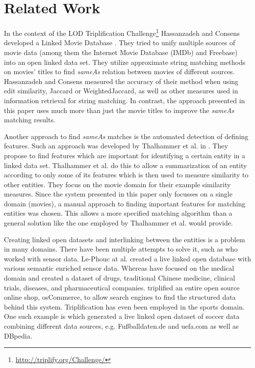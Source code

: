 \section{Related Work}
\label{sec_related_work}


In the context of the LOD Triplification Challenge\footnote{\url{http://triplify.org/Challenge/}} Hassanzadeh and Consens developed a Linked Movie Database \cite{LMDB}.
They tried to unify multiple sources of movie data (among them the Internet Movie Database (IMDb) and Freebase) into an open linked data set.
They utilize approximate string matching methods on movies' titles to find \textit{sameAs} relation between movies of different sources.
Hassanzadeh and Consens measured the accuracy of their method when using edit similarity, Jaccard or WeightedJaccard, as well as other measures used in information retrieval for string matching.
In contrast, the approach presented in this paper uses much more than just the movie titles to improve the \textit{sameAs} matching results.

Another approach to find \textit{sameAs} matches is the automated detection of defining features.
Such an approach was developed by Thalhammer et al. in \cite{MovieSummarization}.
They propose to find features which are important for identifying a certain entity in a linked data set.
Thalhammer et al. do this to allow a summarization of an entity according to only some of its features which is then used to measure similarity to other entities.
They focus on the movie domain for their example similarity measures.
Since the system presented in this paper only focusses on a single domain (movies), a manual approach to finding important features for matching entities was chosen.
This allows a more specified matching algorithm than a general solution like the one employed by Thalhammer et al. would provide.

Creating linked open datasets and interlinking between the entities is a problem in many domains.
There have been multiple attempts to solve it, such as \cite{SensorData} who worked with sensor data.
Le-Phouc at al. created a live linked open database with various semantic enriched sensor data.
Whereas \cite{openDrugData} have focused on the medical domain and created a dataset of drugs, traditional Chinese medicine, clinical trials, diseases, and pharmaceutical companies.
\cite{osCommerce} triplified an entire open source online shop, osCommerce, to allow search engines to find the structured data behind this system.
Triplification has even been employed in the sports domain.
One such example is \cite{smm} which generated a live linked open dataset of soccer data combining different data sources, e.g. Fußballdaten.de and uefa.com as well as DBpedia.



